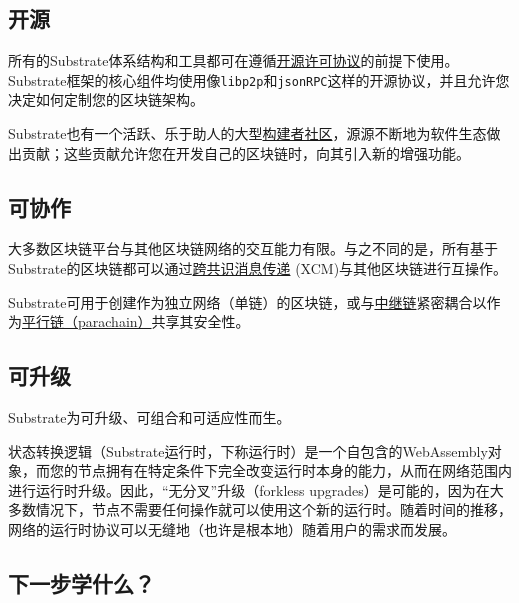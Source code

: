 \hypertarget{ux5f00ux6e90}{%
\subsection{开源}\label{ux5f00ux6e90}}

所有的Substrate体系结构和工具都可在遵循\href{https://github.com/paritytech/substrate\#license}{开源许可协议}的前提下使用。Substrate框架的核心组件均使用像\texttt{libp2p}和\texttt{jsonRPC}这样的开源协议，并且允许您决定如何定制您的区块链架构。

Substrate也有一个活跃、乐于助人的大型\href{https://substrate.io/ecosystem/}{构建者社区}，源源不断地为软件生态做出贡献；这些贡献允许您在开发自己的区块链时，向其引入新的增强功能。

\hypertarget{ux53efux534fux4f5c}{%
\subsection{可协作}\label{ux53efux534fux4f5c}}

大多数区块链平台与其他区块链网络的交互能力有限。与之不同的是，所有基于Substrate的区块链都可以通过\href{https://wiki.polkadot.network/docs/learn-crosschain}{跨共识消息传递}
(XCM)与其他区块链进行互操作。

Substrate可用于创建作为独立网络（单链）的区块链，或与\href{https://wiki.polkadot.network/docs/learn-architecture\#relay-chain}{中继链}紧密耦合以作为\href{https://wiki.polkadot.network/docs/learn-parachains}{平行链（parachain）}共享其安全性。

\hypertarget{ux53efux5347ux7ea7}{%
\subsection{可升级}\label{ux53efux5347ux7ea7}}

Substrate为可升级、可组合和可适应性而生。

状态转换逻辑（Substrate运行时，下称运行时）是一个自包含的WebAssembly对象，而您的节点拥有在特定条件下完全改变运行时本身的能力，从而在网络范围内进行运行时升级。因此，``无分叉''升级（forkless
upgrades）是可能的，因为在大多数情况下，节点不需要任何操作就可以使用这个新的运行时。随着时间的推移，网络的运行时协议可以无缝地（也许是根本地）随着用户的需求而发展。

\hypertarget{ux4e0bux4e00ux6b65ux5b66ux4ec0ux4e48}{%
\subsection{下一步学什么？}\label{ux4e0bux4e00ux6b65ux5b66ux4ec0ux4e48}}


